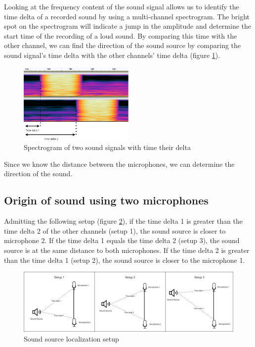 Looking at the frequency content of the sound signal allows us to identify the time delta of a recorded sound by using a multi-channel spectrogram. The bright spot on the spectrogram will indicate a jump in the amplitude and determine the start time of the recording of a loud sound. By comparing this time with the other channel, we can find the direction of the sound source by comparing the sound signal's time delta with the other channels' time delta (figure \ref*{fig:spectrogram_offset}).

\begin{figure}[H]
    \centering
    \includegraphics[width=0.5\textwidth]{../Images/time_delta.png}
    \caption{Spectrogram of two sound signals with time their delta}
    \label{fig:spectrogram_offset}
\end{figure}

Since we know the distance between the microphones, we can determine the direction of the sound.

\subsection{Origin of sound using two microphones}

Admitting the following setup (figure \ref*{fig:microphones_setup}), if the time delta 1 is greater than the time delta 2 of the other channels (setup 1), the sound source is closer to microphone 2. If the time delta 1 equals the time delta 2 (setup 3), the sound source is at the same distance to both microphones. If the time delta 2 is greater than the time delta 1 (setup 2), the sound source is closer to the microphone 1. 

\begin{figure}[H]
    \centering
    \includegraphics[width=1\textwidth]{../Images/microphones_setups.png}
    \caption{Sound source localization setup}
    \label{fig:microphones_setup}
\end{figure}

